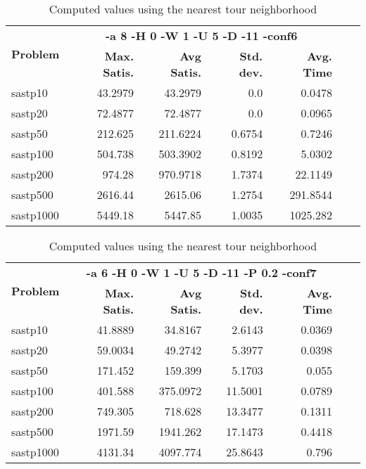\documentclass{article}
\begin{document}
\begin{table}[b!]
  \vspace{-6mm}%
  \caption{Computed values using the nearest tour neighborhood}
  \label{tab:NearestTour}
  \setlength{\tabcolsep}{1.4mm}
  \centering
  \begin{tabular}{lrrrrrr}
   \multirow{2}{*}{\bfseries Problem} &
      \multicolumn{4}{c}{\bfseries -a 8 -H 0 -W 1 -U 5 -D -11 -conf6 } \\
    &
    \bfseries Max. Satis. &
    \bfseries Avg Satis. &
    \bfseries Std. dev. &
    \bfseries Avg. Time 
    \\\hline
sastp10 & 43.2979 & 43.2979 & 0.0 & 0.0478 \\ 
sastp20 & 72.4877 & 72.4877 & 0.0 & 0.0965 \\ 
sastp50 & 212.625 & 211.6224 & 0.6754 & 0.7246 \\ 
sastp100 & 504.738 & 503.3902 & 0.8192 & 5.0302 \\ 
sastp200 & 974.28 & 970.9718 & 1.7374 & 22.1149 \\ 
sastp500 & 2616.44 & 2615.06 & 1.2754 & 291.8544 \\ 
sastp1000 & 5449.18 & 5447.85 & 1.0035 & 1025.282
    \\\hline
  \end{tabular}

\end{table}

\begin{table}[b!]
  \vspace{-6mm}%
  \caption{Computed values using the nearest tour neighborhood}
  \label{tab:NearestTour}
  \setlength{\tabcolsep}{1.4mm}
  \centering
  \begin{tabular}{lrrrrrr}
   \multirow{2}{*}{\bfseries Problem} &
      \multicolumn{4}{c}{\bfseries -a 6 -H 0 -W 1 -U 5 -D -11 -P 0.2 -conf7 } \\
    &
    \bfseries Max. Satis. &
    \bfseries Avg Satis. &
    \bfseries Std. dev. &
    \bfseries Avg. Time 
    \\\hline
   sastp10 & 41.8889 & 34.8167 & 2.6143 & 0.0369 \\ 
sastp20 & 59.0034 & 49.2742 & 5.3977 & 0.0398 \\ 
sastp50 & 171.452 & 159.399 & 5.1703 & 0.055 \\ 
sastp100 & 401.588 & 375.0972 & 11.5001 & 0.0789 \\ 
sastp200 & 749.305 & 718.628 & 13.3477 & 0.1311 \\ 
sastp500 & 1971.59 & 1941.262 & 17.1473 & 0.4418 \\ 
sastp1000 & 4131.34 & 4097.774 & 25.8643 & 0.796

    \\\hline
  \end{tabular}

\end{table}
\end{document}
